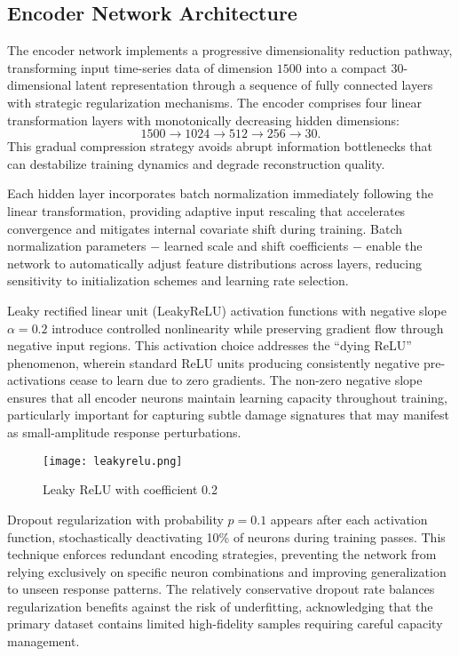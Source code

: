\documentclass[12pt,a4paper]{report}
\begin{document}
\subsection{Encoder Network Architecture}
\label{subsec:encoder_architecture}

The encoder network implements a progressive dimensionality reduction pathway, transforming input time-series data of dimension $1500$ into a compact $30$-dimensional latent representation through a sequence of fully connected layers with strategic regularization mechanisms. The encoder comprises four linear transformation layers with monotonically decreasing hidden dimensions:
\[
1500 \rightarrow 1024 \rightarrow 512 \rightarrow 256 \rightarrow 30.
\]
This gradual compression strategy avoids abrupt information bottlenecks that can destabilize training dynamics and degrade reconstruction quality.

Each hidden layer incorporates batch normalization immediately following the linear transformation, providing adaptive input rescaling that accelerates convergence and mitigates internal covariate shift during training. Batch normalization parameters $-$ learned scale and shift coefficients $-$ enable the network to automatically adjust feature distributions across layers, reducing sensitivity to initialization schemes and learning rate selection.

Leaky rectified linear unit (LeakyReLU) activation functions with negative slope $\alpha = 0.2$ introduce controlled nonlinearity while preserving gradient flow through negative input regions. This activation choice addresses the ``dying ReLU'' phenomenon, wherein standard ReLU units producing consistently negative pre-activations cease to learn due to zero gradients. The non-zero negative slope ensures that all encoder neurons maintain learning capacity throughout training, particularly important for capturing subtle damage signatures that may manifest as small-amplitude response perturbations.

\begin{figure}[htbp]
\centering
\texttt{[image: leakyrelu.png]}
\caption{Leaky ReLU
with coefficient 0.2}
\label{fig:leakyrelu}
\end{figure}

Dropout regularization with probability $p = 0.1$ appears after each activation function, stochastically deactivating 10\% of neurons during training passes. This technique enforces redundant encoding strategies, preventing the network from relying exclusively on specific neuron combinations and improving generalization to unseen response patterns. The relatively conservative dropout rate balances regularization benefits against the risk of underfitting, acknowledging that the primary dataset contains limited high-fidelity samples requiring careful capacity management.
\end{document}
